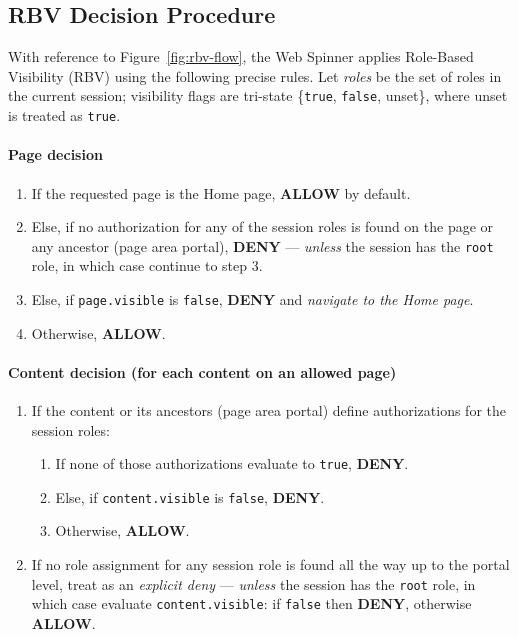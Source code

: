 \subsection{RBV Decision Procedure}
\label{sec:rbv-decision}

With reference to Figure~\ref{fig:rbv-flow}, the Web Spinner applies Role-Based Visibility (RBV) using the following precise rules. Let \emph{roles} be the set of roles in the current session; visibility flags are tri-state \{\texttt{true}, \texttt{false}, unset\}, where unset is treated as \texttt{true}.

\paragraph{Page decision}
\begin{enumerate}
	\item If the requested page is the Home page, \textbf{ALLOW} by default.
	\item Else, if no authorization for any of the session roles is found on the page or any ancestor (page \textrightarrow{} area \textrightarrow{} portal), \textbf{DENY} — \emph{unless} the session has the \texttt{root} role, in which case continue to step 3.
	\item Else, if \texttt{page.visible} is \texttt{false}, \textbf{DENY} and \emph{navigate to the Home page}.
	\item Otherwise, \textbf{ALLOW}.
\end{enumerate}

\paragraph{Content decision (for each content on an allowed page)}
\begin{enumerate}
	\item If the content or its ancestors (page \textrightarrow{} area \textrightarrow{} portal) define authorizations for the session roles:
		\begin{enumerate}
			\item If none of those authorizations evaluate to \texttt{true}, \textbf{DENY}.
			\item Else, if \texttt{content.visible} is \texttt{false}, \textbf{DENY}.
			\item Otherwise, \textbf{ALLOW}.
		\end{enumerate}
	\item If no role assignment for any session role is found all the way up to the portal level, treat as an \emph{explicit deny} — \emph{unless} the session has the \texttt{root} role, in which case evaluate \texttt{content.visible}: if \texttt{false} then \textbf{DENY}, otherwise \textbf{ALLOW}.
\end{enumerate}

